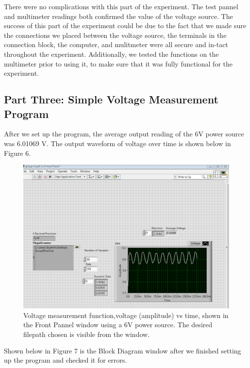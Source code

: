 \documentclass[twoside,10pt]{article}
\begin{document}
\begin{multicols}{2}
		There were no complications with this part of the experiment. The test pannel and multimeter readings both confirmed the value of the voltage source. The success of this part of the experiment could be due to the fact that we made sure the connections we placed between the voltage source, the terminals in the connection block, the computer, and mulitmeter were all secure and in-tact throughout the experiment. Additionally, we tested the functions on the multimeter prior to using it, to make sure that it was fully functional for the experiment. 
		
		\subsection*{Part Three: Simple Voltage Measurement Program}
		
		After we set up the program, the average output reading of the 6V power source was 6.01069 V. The output waveform of voltage over time is shown below in Figure 6. 
		
			\begin{figure}[H]
			\centering
			\includegraphics[width=\linewidth]{1.png}
			\caption{Voltage measurement function,voltage (amplitude) vs time, shown in the Front Pannel window using a 6V power source. The desired filepath chosen is visible from the window.}
		\end{figure}
		
		Shown below in Figure 7 is the Block Diagram window after we finished setting up the program and checked it for errors.
		

\end{multicols}
\end{document}
